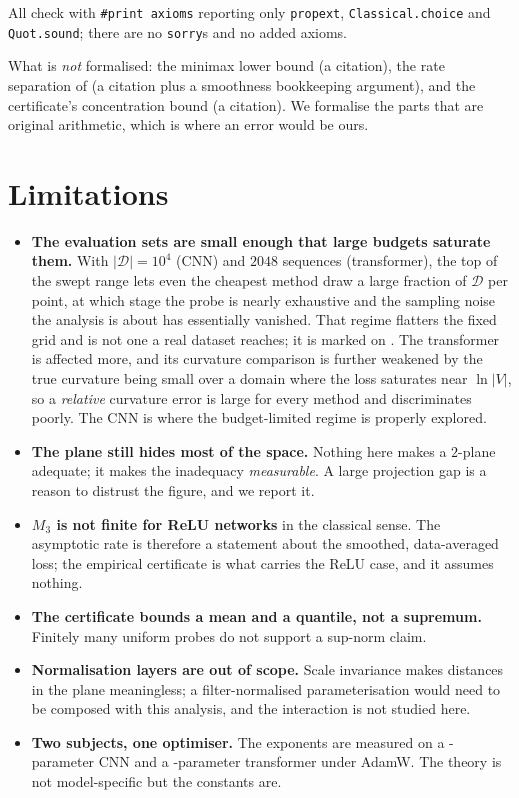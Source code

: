 \documentclass[11pt]{article}
\theoremstyle{definition}
\newcommand{\D}{\mathcal{D}}
\begin{document}
\noindent All check with \texttt{\#print axioms} reporting only \texttt{propext},
\texttt{Classical.choice} and \texttt{Quot.sound}; there are no \texttt{sorry}s and no
added axioms.

What is \emph{not} formalised: the minimax lower bound (a citation), the rate
separation of  (a citation plus a smoothness bookkeeping argument), and
the certificate's concentration bound (a citation). We formalise the parts that are
original arithmetic, which is where an error would be ours.

\section{Limitations}
\label{sec:limits}

\begin{itemize}[leftmargin=1.4em,itemsep=1pt]
\item \textbf{The evaluation sets are small enough that large budgets saturate them.}
With $|\D|=10^4$ (CNN) and $2048$ sequences (transformer), the top of the swept range
lets even the cheapest method draw a large fraction of $\D$ per point, at which stage
the probe is nearly exhaustive and the sampling noise the analysis is about has
essentially vanished. That regime flatters the fixed grid and is not one a real dataset
reaches; it is marked on . The transformer is affected more, and its
curvature comparison is further weakened by the true curvature being small over a domain
where the loss saturates near $\ln|V|$, so a \emph{relative} curvature error is large for
every method and discriminates poorly. The CNN is where the budget-limited regime is
properly explored.
\item \textbf{The plane still hides most of the space.} Nothing here makes a $2$-plane
adequate; it makes the inadequacy \emph{measurable}. A large projection gap is a reason
to distrust the figure, and we report it.
\item \textbf{$M_3$ is not finite for ReLU networks} in the classical sense. The
asymptotic rate is therefore a statement about the smoothed, data-averaged loss; the
empirical certificate is what carries the ReLU case, and it assumes nothing.
\item \textbf{The certificate bounds a mean and a quantile, not a supremum.} Finitely
many uniform probes do not support a sup-norm claim.
\item \textbf{Normalisation layers are out of scope.} Scale invariance makes distances
in the plane meaningless; a filter-normalised parameterisation \citep{li2018visualizing}
would need to be composed with this analysis, and the interaction is not studied here.
\item \textbf{Two subjects, one optimiser.} The exponents are measured on a
\CNNparams-parameter CNN and a \GPTparams-parameter transformer under AdamW. The
theory is not model-specific but the constants are.
\end{itemize}
\end{document}
